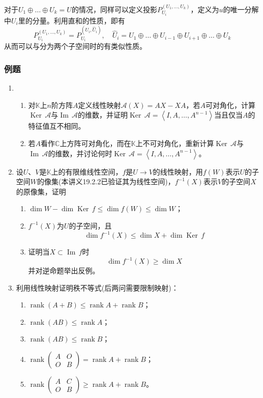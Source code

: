 \documentclass[a4paper,UTF8,fontset=windows,AutoFakeBold]{ctexart}
\DeclareMathOperator{\rank}{rank}
\DeclareMathOperator{\im}{Im\,}
\DeclareMathOperator{\Ker}{Ker\,}
\newcommand*{\ma}{\mathcal{A}}
\newcommand*{\note}{\noindent *}
\begin{document}
\note 对于$U_1\oplus\dots\oplus U_k=U$的情况，同样可以定义投影$P_{U_i}^{(U_1,\dots,U_k)}$，定义为$u$的唯一分解中$U_i$里的分量。利用直和的性质，即有
$$P_{U_i}^{(U_1,\dots,U_k)}=P_{U_i}^{(U_i,\hat{U}_i)},\quad \hat{U}_i=U_1\oplus\dots\oplus U_{i-1}\oplus U_{i+1}\oplus\dots\oplus U_k$$
从而可以与分为两个子空间时的有类似性质。

\subsubsection{例题}
\begin{enumerate}
    \item
    \begin{enumerate}
        \item 对$\mathbb{K}$上$n$阶方阵$A$定义线性映射$\ma(X)=AX-XA$，若$A$可对角化，计算$\Ker\ma$与$\im\ma$的维数，并证明$\Ker\ma=\left<I,A,\dots,A^{n-1}\right>$当且仅当$A$的特征值互不相同。
        \item 若$A$看作$\mathbb{C}$上方阵可对角化，而在$\mathbb{K}$上不可对角化，重新计算$\Ker\ma$与$\im\ma$的维数，并讨论何时$\Ker\ma=\left<I,A,\dots,A^{n-1}\right>$。
    \end{enumerate}
    \item 设$U$、$V$是$\mathbb{K}$上的有限维线性空间，$f$是$U\to V$的线性映射，用$f(W)$表示$U$的子空间$W$的像集(本讲义19.2.2已验证其为线性空间)，$f^{-1}(X)$表示$V$的子空间$X$的原像集，证明
    \begin{enumerate}
        \item $\dim W-\dim\Ker f\le\dim f(W)\le \dim W$；
        \item $f^{-1}(X)$为$U$的子空间，且
        $$\dim f^{-1}(X)\le \dim X+\dim\Ker f$$
        \item 证明当$X\subset\im f$时
        $$\dim f^{-1}(X)\ge\dim X$$
        并对逆命题举出反例。
    \end{enumerate}
    \item 利用线性映射证明秩不等式(后两问需要限制映射)：
    \begin{enumerate}
        \item $\rank(A+B)\le\rank A+\rank B$；
        \item $\rank(AB)\le\rank A$；
        \item $\rank(AB)\le\rank B$；
        \item $\rank\begin{pmatrix}A&O\\O&B\end{pmatrix}=\rank A+\rank B$；
        \item $\rank\begin{pmatrix}A&C\\O&B\end{pmatrix}\ge\rank A+\rank B$。

\end{enumerate}
\end{enumerate}
\end{document}
